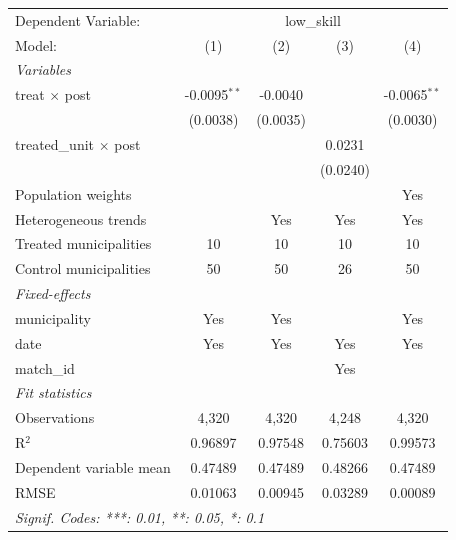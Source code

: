 
\begingroup
\centering
\begin{tabular}{lcccc}
   \tabularnewline \midrule \midrule
   Dependent Variable: & \multicolumn{4}{c}{low\_skill}\\
   Model:                        & (1)            & (2)      & (3)      & (4)\\  
   \midrule
   \emph{Variables}\\
   treat $\times$ post           & -0.0095$^{**}$ & -0.0040  &          & -0.0065$^{**}$\\   
                                 & (0.0038)       & (0.0035) &          & (0.0030)\\   
   treated\_unit $\times$ post   &                &          & 0.0231   &   \\   
                                 &                &          & (0.0240) &   \\   
   Population weights            &                &          &          & Yes\\  
   Heterogeneous trends          &                & Yes      & Yes      & Yes\\  
   Treated municipalities        & 10             & 10       & 10       & 10\\  
   Control municipalities        & 50             & 50       & 26       & 50\\  
   \midrule
   \emph{Fixed-effects}\\
   municipality                  & Yes            & Yes      &          & Yes\\  
   date                          & Yes            & Yes      & Yes      & Yes\\  
   match\_id                     &                &          & Yes      & \\  
   \midrule
   \emph{Fit statistics}\\
   Observations                  & 4,320          & 4,320    & 4,248    & 4,320\\  
   R$^2$                         & 0.96897        & 0.97548  & 0.75603  & 0.99573\\  
   Dependent variable mean       & 0.47489        & 0.47489  & 0.48266  & 0.47489\\  
   RMSE                          & 0.01063        & 0.00945  & 0.03289  & 0.00089\\  
   \midrule \midrule
   \multicolumn{5}{l}{\emph{Signif. Codes: ***: 0.01, **: 0.05, *: 0.1}}\\
\end{tabular}
\par\endgroup


